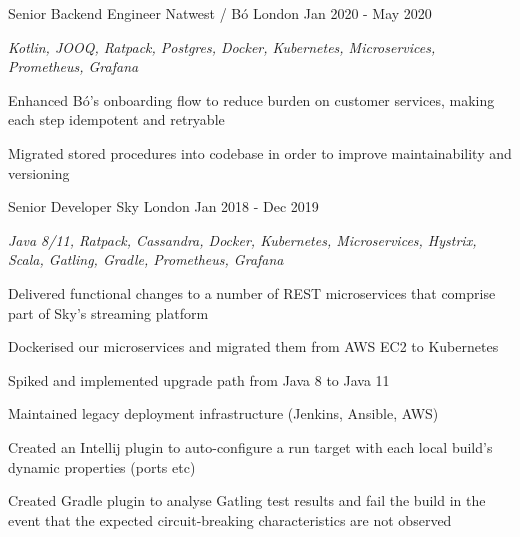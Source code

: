 \begin{cventries}
  \cventry
    {Senior Backend Engineer} %
    {Natwest / Bó} %
    {London} %
    {Jan 2020 - May 2020} %
    {
      \begin{cvitems} %
        \item {\itshape{Kotlin, JOOQ, Ratpack, Postgres, Docker, Kubernetes, Microservices, Prometheus, Grafana}}
        \item {Enhanced Bó's onboarding flow to reduce burden on customer services, making each step idempotent and retryable}
        \item {Migrated stored procedures into codebase in order to improve maintainability and versioning}
      \end{cvitems}
    }

  \cventry
    {Senior Developer} %
    {Sky} %
    {London} %
    {Jan 2018 - Dec 2019} %
    {
      \begin{cvitems} %
        \item {\itshape{Java 8/11, Ratpack, Cassandra, Docker, Kubernetes, Microservices, Hystrix, Scala, Gatling, Gradle, Prometheus, Grafana}}
        \item {Delivered functional changes to a number of REST microservices that comprise part of Sky’s streaming platform}
        \item {Dockerised our microservices and migrated them from AWS EC2 to Kubernetes}
        \item {Spiked and implemented upgrade path from Java 8 to Java 11}
        \item {Maintained legacy deployment infrastructure (Jenkins, Ansible, AWS)}
        \item {Created an Intellij plugin to auto-configure a run target with each local build's dynamic properties (ports etc)}
        \item {Created Gradle plugin to analyse Gatling test results and fail the build in the event that the expected circuit-breaking characteristics are not observed}
      \end{cvitems}
    }


\end{cventries}
